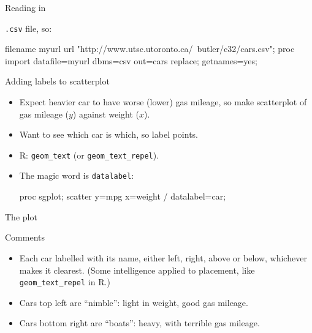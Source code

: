 \documentclass[unknownkeysallowed]{beamer}\usepackage[]{graphicx}\usepackage[]{color}
\begin{document}
\begin{frame}[fragile]{Reading in}
  
  \texttt{.csv} file, so:
  
    \begin{Datastep}
filename myurl url 
  "http://www.utsc.utoronto.ca/~butler/c32/cars.csv";      
proc import 
  datafile=myurl
  dbms=csv
  out=cars
  replace;
  getnames=yes;
    \end{Datastep}
  
  
\end{frame}

\begin{frame}[fragile]{Adding labels to scatterplot}
  
  \begin{itemize}
  \item Expect heavier car to have worse (lower) gas mileage, so make
    scatterplot of gas mileage ($y$) against weight ($x$).
  \item Want to see which car is which, so label points. 
    
  \item R: \texttt{geom\_text} (or \texttt{geom\_text\_repel}).
  \item The magic word is \texttt{datalabel}:
    
    \begin{Sascode}[store=muggins]
proc sgplot;
  scatter y=mpg x=weight / datalabel=car;
    \end{Sascode}
  \end{itemize}
  
\end{frame}


\begin{frame}[fragile]{The plot}
  
  
\end{frame}

\begin{frame}[fragile]{Comments}
  
  \begin{itemize}
  \item Each car labelled with its name, either left, right, above or
    below, whichever makes it clearest. (Some intelligence applied to
    placement, like \texttt{geom\_text\_repel} in R.)
  \item Cars top left are ``nimble'': light in weight, good gas
    mileage.
  \item Cars bottom right are ``boats'': heavy, with terrible gas mileage.
  \end{itemize}
  
\end{frame}
\end{document}
